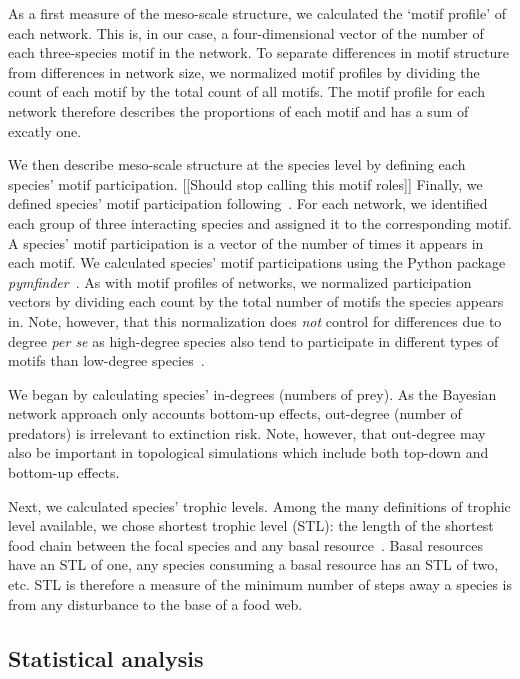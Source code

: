 \documentclass[12pt]{article}
\begin{document}
\begin{spacing}{2.0}
        As a first measure of the meso-scale structure, we calculated the `motif profile' of each network.
        This is, in our case, a four-dimensional vector of the number of each three-species motif in the network.
        To separate differences in motif structure from differences in network size, we normalized motif profiles by dividing the count of each motif by the total count of all motifs.
        The motif profile for each network therefore describes the proportions of each motif and has a sum of excatly one.

    
        We then describe meso-scale structure at the species level by defining each species' motif participation. [[Should stop calling this motif roles]]
		Finally, we defined species' motif participation following~\citet{Stouffer2012}. 
		For each network, we identified each group of three interacting species and assigned it to the corresponding motif. 
		A species' motif participation is a vector of the number of times it appears in each motif.
		We calculated species' motif participations using the Python package \emph{pymfinder}~\citep{pymfinder}.
        As with motif profiles of networks, we normalized participation vectors by dividing each count by the total number of motifs the species appears in.
        Note, however, that this normalization does \emph{not} control for differences due to degree \emph{per se} as high-degree species also tend to participate in different types of motifs than low-degree species~\citep{Cirtwill2021_inprep}.
        
        
		We began by calculating species' in-degrees (numbers of prey).
		As the Bayesian network approach only accounts  bottom-up effects, out-degree (number of predators) is irrelevant to extinction risk.
		Note, however, that out-degree may also be important in topological simulations which include both top-down and bottom-up effects. 

        Next, we calculated species' trophic levels. 
		Among the many definitions of trophic level available, we chose shortest trophic level (STL): the length of the shortest food chain between the focal species and any basal resource~\citep{Williams2004}. 
		Basal resources have an STL of one, any species consuming a basal resource has an STL of two, etc.
        STL is therefore a measure of the minimum number of steps away a species is from any disturbance to the base of a food web.

        
	\subsection*{Statistical analysis} 


\end{spacing}
\end{document}
